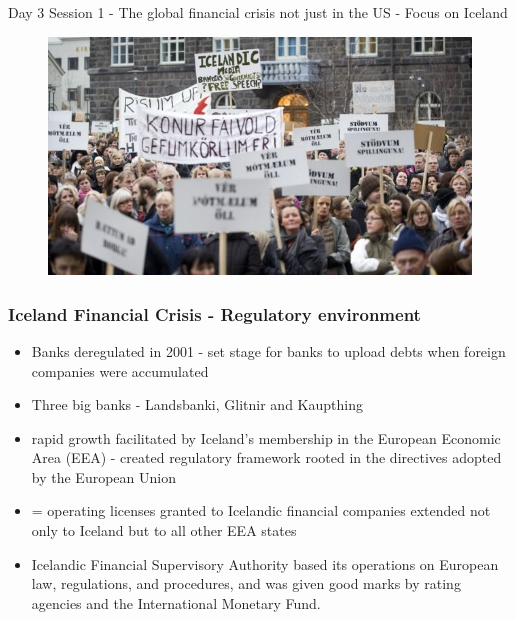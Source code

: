 \documentclass[11pt]{beamer}
\begin{document}
\begin{frame}
\begin{center}
Day 3 Session 1 - The global financial crisis not just in the US - Focus on Iceland
\end{center}
\end{frame}

\begin{frame}
\begin{figure}
\centering
\includegraphics[width=\textwidth]{Iceland1.png}
\end{figure}
\end{frame}



\begin{frame}
\frametitle{Iceland Financial Crisis - Regulatory environment}
\begin{itemize}
\item Banks deregulated in 2001 - set stage for banks to upload debts when foreign companies were accumulated
\item Three big banks -  Landsbanki, Glitnir and Kaupthing
\item rapid growth facilitated by Iceland’s membership in the European Economic Area (EEA) - created regulatory framework rooted in the directives adopted by the European Union
\item = operating licenses granted to Icelandic financial companies extended not only to Iceland but to all other EEA states
\item Icelandic Financial Supervisory Authority based its operations
on European law, regulations, and procedures, and was given good marks by rating agencies and the International Monetary Fund.

\end{itemize}

\end{frame}
\end{document}

